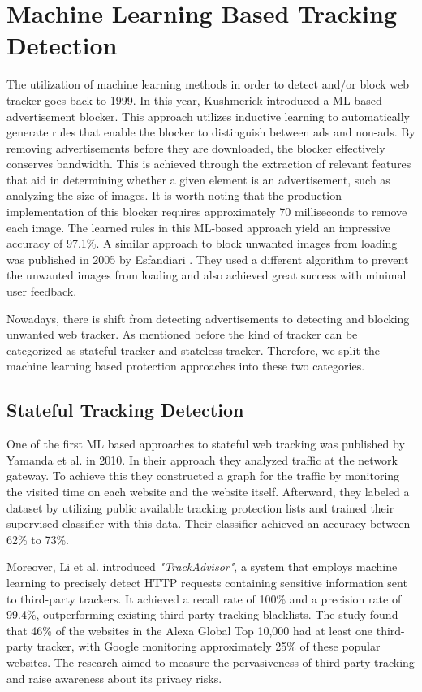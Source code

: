 \section{Machine Learning Based Tracking Detection}

The utilization of machine learning methods in order to detect and/or block web tracker goes back to 1999. In this year, Kushmerick \cite{kushmerick1999learning}
introduced a ML based advertisement blocker. This approach utilizes inductive learning to automatically
generate rules that enable the blocker to distinguish between ads and non-ads. By removing advertisements before they are downloaded,
the blocker effectively conserves bandwidth. This is achieved through the extraction of relevant features that aid in determining
whether a given element is an advertisement, such as analyzing the size of images. It is worth noting that the production implementation of
this blocker requires approximately 70 milliseconds to remove each image. The learned rules in this ML-based approach yield an
impressive accuracy of 97.1\%. A similar approach to block unwanted images from loading was published in 2005 by Esfandiari \cite{esfandiari2005adaptive}.
They used a different algorithm to prevent the unwanted images from loading and also achieved great success with minimal user feedback.

Nowadays, there is shift from detecting advertisements to detecting and blocking unwanted web tracker. As mentioned before 
the kind of tracker can be categorized as stateful tracker and stateless tracker. Therefore, we split the machine learning based
protection approaches into these two categories.

\subsection{Stateful Tracking Detection}

One of the first ML based approaches to stateful web tracking was published by Yamanda et al. \cite{yamada2010web} in 2010.
In their approach they analyzed traffic at the network gateway. To achieve this they constructed a graph for the traffic by monitoring the visited
time on each website and the website itself. Afterward, they labeled a dataset by utilizing public available tracking protection lists
and trained their supervised classifier with this data. Their classifier achieved an accuracy between 62\% to 73\%.

Moreover, Li et al. \cite{li2015trackadvisor} introduced \emph{"TrackAdvisor"}, a system that
employs machine learning to precisely detect HTTP requests containing sensitive information sent to third-party trackers.
It achieved a recall rate of 100\% and a precision rate of 99.4\%, outperforming
existing third-party tracking blacklists. The study found that 46\% of the websites in the Alexa Global Top 10,000 had at least
one third-party tracker, with Google monitoring approximately 25\% of these popular websites. The research aimed to measure
the pervasiveness of third-party tracking and raise awareness about its privacy risks.


